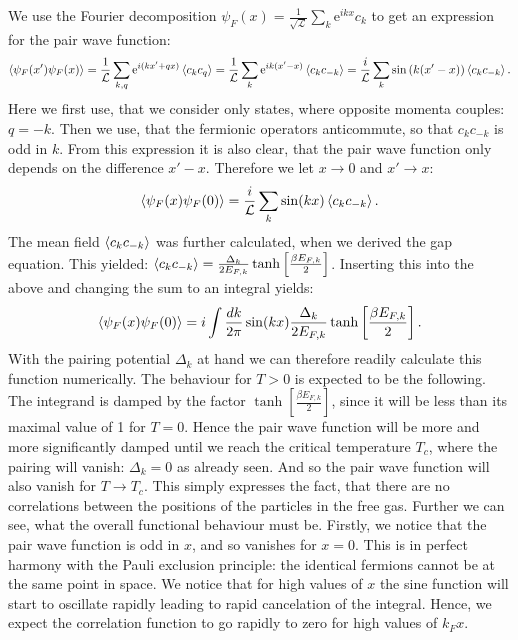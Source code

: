 We use the Fourier decomposition $\psi_F(x) = \frac{1}{\sqrt{\mathcal{L}}} \sum_k \text{e}^{ikx} c_k$ to get an expression for the pair wave function:
\begin{equation}
\braket{\psi_F(x')\psi_F(x)} = \frac{1}{\mathcal{L}} \sum_{k,q} \text{e}^{i(kx' + qx)}\braket{c_{k}c_{q}} = \frac{1}{\mathcal{L}} \sum_{k} \text{e}^{ik(x' - x)}\braket{c_{k}c_{-k}} = \frac{i}{\mathcal{L}} \sum_{k} \sin\left(k(x' - x)\right)\braket{c_{k}c_{-k}}. \nonumber 
\end{equation}
Here we first use, that we consider only states, where opposite momenta couples: $q = -k$. Then we use, that the fermionic operators anticommute, so that $c_kc_{-k}$ is odd in $k$. From this expression it is also clear, that the pair wave function only depends on the difference $x'-x$. Therefore we let $x \to 0$ and $x' \to x$:
\begin{equation}
\braket{\psi_F(x) \psi_F(0)} = \frac{i}{\mathcal{L}}\sum_{k} \sin(kx)\braket{c_{k}c_{-k}}. \nonumber
\end{equation}
The mean field $\braket{c_{k}c_{-k}}$ was further calculated, when we derived the gap equation. This yielded: $\braket{c_{k}c_{-k}} = \frac{\Delta_k}{2E_{F,k}}\tanh\left[\frac{\beta E_{F,k} }{2}\right]$. Inserting this into the above and changing the sum to an integral yields:
\begin{equation}
\braket{\psi_F(x) \psi_F(0)} = i\int \frac{dk}{2\pi} \sin(kx)\frac{\Delta_k}{2E_{F,k}}\tanh\left[\frac{ \beta E_{F,k} }{2}\right].
\label{eq.pairwavefunction}
\end{equation}
With the pairing potential $\Delta_k$ at hand we can therefore readily calculate this function numerically. The behaviour for $T > 0$ is expected to be the following. The integrand is damped by the factor $\tanh\left[\frac{ \beta E_{F,k} }{2}\right]$, since it will be less than its maximal value of 1 for $T = 0$. Hence the pair wave function will be more and more significantly damped until we reach the critical temperature $T_c$, where the pairing will vanish: $\Delta_k = 0$ as already seen. And so the pair wave function will also vanish for $T\to T_c$. This simply expresses the fact, that there are no correlations between the positions of the particles in the free gas. Further we can see, what the overall functional behaviour must be. Firstly, we notice that the pair wave function is odd in $x$, and so vanishes for $x = 0$. This is in perfect harmony with the Pauli exclusion principle: the identical fermions cannot be at the same point in space. We notice that for high values of $x$ the sine function will start to oscillate rapidly leading to rapid cancelation of the integral. Hence, we expect the correlation function to go rapidly to zero for high values of $k_F x$. 

